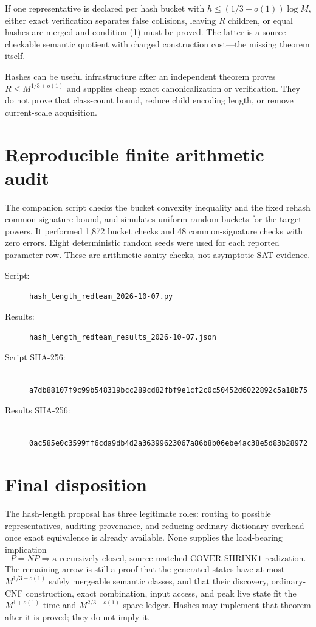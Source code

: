 \documentclass[11pt]{article}
\begin{document}
If one representative is declared per hash bucket with
$h\le(1/3+o(1))\log M$, either exact verification separates false collisions,
leaving $R$ children, or equal hashes are merged and condition (1) must be
proved.  The latter is a source-checkable semantic quotient with charged
construction cost---the missing theorem itself.

Hashes can be useful infrastructure after an independent theorem proves
$R\le M^{1/3+o(1)}$ and supplies cheap exact canonicalization or verification.
They do not prove that class-count bound, reduce child encoding length, or
remove current-scale acquisition.

\section{Reproducible finite arithmetic audit}

The companion script checks the bucket convexity inequality and the fixed
rehash common-signature bound, and simulates uniform random buckets for the
target powers.  It performed 1,872 bucket checks and 48 common-signature
checks with zero errors.  Eight deterministic random seeds were used for each
reported parameter row.  These are arithmetic sanity checks, not asymptotic
SAT evidence.

\begin{description}
\item[Script:] \texttt{hash\_length\_redteam\_2026-10-07.py}
\item[Results:] \texttt{hash\_length\_redteam\_results\_2026-10-07.json}
\item[Script SHA-256:]\leavevmode\\
\nolinkurl{a7db88107f9c99b548319bcc289cd82fbf9e1cf2c0c50452d6022892c5a18b75}
\item[Results SHA-256:]\leavevmode\\
\nolinkurl{0ac585e0c3599ff6cda9db4d2a36399623067a86b8b06ebe4ac38e5d83b28972}
\end{description}

\section{Final disposition}

The hash-length proposal has three legitimate roles: routing to possible
representatives, auditing provenance, and reducing ordinary dictionary
overhead once exact equivalence is already available.  None supplies the
load-bearing implication
\[
 P=NP
 \Longrightarrow
 \text{a recursively closed, source-matched COVER-SHRINK1 realization}.
\]
The remaining arrow is still a proof that the generated states have at most
$M^{1/3+o(1)}$ safely mergeable semantic classes, and that their discovery,
ordinary-CNF construction, exact combination, input access, and peak live
state fit the $M^{1+o(1)}$-time and $M^{2/3+o(1)}$-space ledger.  Hashes may
implement that theorem after it is proved; they do not imply it.
\end{document}
